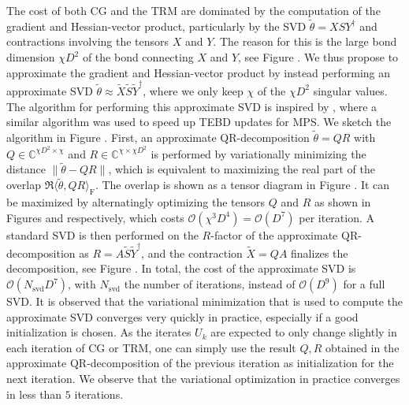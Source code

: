 The cost of both CG and the TRM are dominated by the computation of the gradient and Hessian-vector product, particularly by the SVD $\tilde{\theta} = XSY^\dagger$ and contractions involving the tensors $X$ and $Y$. The reason for this is the large bond dimension $\chi D^2$ of the bond connecting $X$ and $Y$, see Figure . We thus propose to approximate the gradient and Hessian-vector product by instead performing an approximate SVD $\tilde{\theta} \approx \tilde{X}\tilde{S}\tilde{Y}^\dagger$, where we only keep $\chi$ of the $\chi D^2$ singular values. The algorithm for performing this approximate SVD is inspired by \cite{cite:fast_time_evolution_of_mps_using_qr}, where a similar algorithm was used to speed up TEBD updates for MPS. We sketch the algorithm in Figure . First, an approximate QR-decomposition $\tilde{\theta} = QR$ with $Q\in\mathbb{C}^{\chi D^2\times\chi}$ and $R\in\mathbb{C}^{\chi\times\chi D^2}$ is performed by variationally minimizing the distance $\lVert \tilde{\theta} - QR \rVert$, which is equivalent to maximizing the real part of the overlap $\Re\langle\tilde{\theta},QR\rangle_\text{F}$. The overlap is shown as a tensor diagram in Figure . It can be maximized by alternatingly optimizing the tensors $Q$ and $R$ as shown in Figures  and  respectively, which costs $\mathcal{O}(\chi^3D^4) = \mathcal{O}(D^7)$ per iteration. A standard SVD is then performed on the $R$-factor of the approximate QR-decomposition as $R = A\tilde{S}\tilde{Y}^\dagger$, and the contraction $\tilde{X} = QA$ finalizes the decomposition, see Figure . In total, the cost of the approximate SVD is $\mathcal{O}(N_\text{svd}D^7)$, with $N_\text{svd}$ the number of iterations, instead of $\mathcal{O}(D^9)$ for a full SVD. It is observed that the variational minimization that is used to compute the approximate SVD converges very quickly in practice, especially if a good initialization is chosen. As the iterates $U_k$ are expected to only change slightly in each iteration of CG or TRM, one can simply use the result $Q, R$ obtained in the approximate QR-decomposition of the previous iteration as initialization for the next iteration. We observe that the variational optimization in practice converges in less than $5$ iterations. \par
